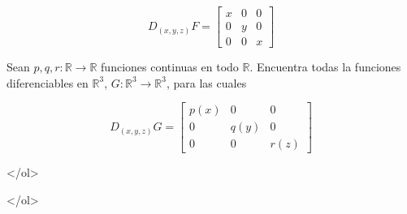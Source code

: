 \documentclass{article}
\theoremstyle{definition}
\begin{document}
      $$
      D_{(x,y,z)}F=\left[
        \begin{array}{ccc}
          x & 0 & 0 \\
          0 & y & 0 \\
          0 & 0 & x
        \end{array}
      \right]
      $$

    \item Sean $p,q,r:\mathbb{R}\to \mathbb{R}$ funciones continuas en todo $\mathbb{R}$. Encuentra
      todas la funciones diferenciables en $\mathbb{R}^3$, $G:\mathbb{R}^3 \to \mathbb{R}^3$, para
      las cuales

      $$
      D_{(x,y,z)}G=\left[
        \begin{array}{ccc}
          p(x) & 0 & 0 \\
          0 & q(y) & 0 \\
          0 & 0 & r(z)
        \end{array}
      \right]
      $$

      
    </ol>

    </ol>

       
\end{document}
